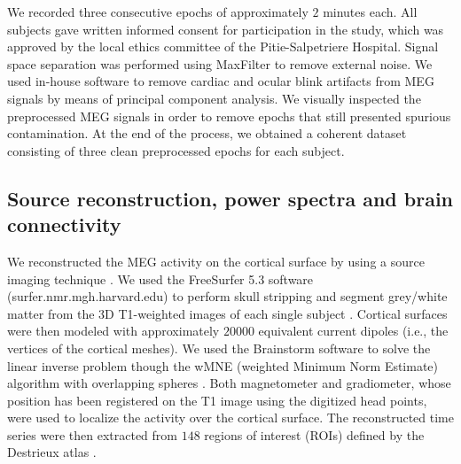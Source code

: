 We recorded three consecutive epochs of approximately $2$ minutes each. All subjects gave written informed consent for participation in the study, which was approved by the local ethics committee of the Pitie-Salpetriere Hospital. Signal space separation was performed using MaxFilter \citep{taulu_spatiotemporal_2006} to remove external noise. We used in-house software to remove  cardiac and ocular blink artifacts from MEG signals by means of principal component analysis.
We visually inspected the preprocessed MEG signals in order to remove epochs that still presented spurious contamination.
At the end of the process, we obtained a coherent dataset consisting of three clean preprocessed epochs for each subject.

\subsection{Source reconstruction, power spectra and brain connectivity} \label{subsec:brain_connectivity}

We reconstructed the MEG activity on the cortical surface by using a source imaging technique \citep{he_brain_1999,baillet_evaluation_2001}.
We used the FreeSurfer 5.3 software (surfer.nmr.mgh.harvard.edu) to perform skull stripping and segment grey/white matter from the 3D T1-weighted images of each single subject \citep{fischl_whole_2002, fischl_sequence-independent_2004}. Cortical surfaces were then modeled with approximately $20000$ equivalent current dipoles (i.e., the vertices of the cortical meshes).
We used the Brainstorm software \citep{tadel_brainstorm:_2011} to solve the linear inverse problem though the wMNE (weighted Minimum Norm Estimate) algorithm with overlapping spheres \citep{lin_assessing_2006}. Both magnetometer and gradiometer, whose position has been registered on the T1 image using the digitized head points, were used to localize the activity over the cortical surface.
The reconstructed time series were then extracted from $148$ regions of interest (ROIs) defined by the Destrieux atlas \citep{destrieux_automatic_2010-1}.

